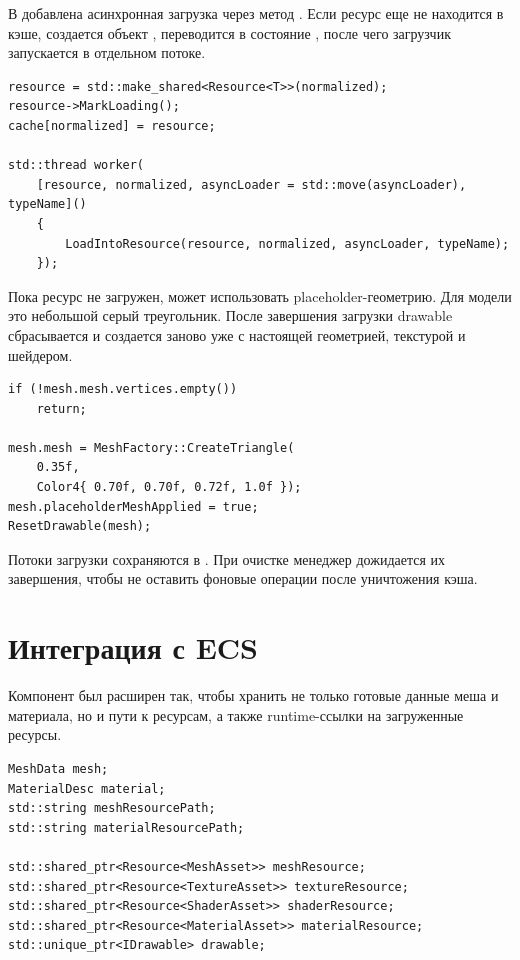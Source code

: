 \documentclass[14pt,a4paper]{extarticle}
\begin{document}
В  добавлена асинхронная загрузка через метод . Если ресурс еще
не находится в кэше, создается объект , переводится в состояние , после
чего загрузчик запускается в отдельном потоке.

\begin{lstlisting}[style=cppgost,caption={Идея асинхронной загрузки ресурса}]
resource = std::make_shared<Resource<T>>(normalized);
resource->MarkLoading();
cache[normalized] = resource;

std::thread worker(
    [resource, normalized, asyncLoader = std::move(asyncLoader), typeName]()
    {
        LoadIntoResource(resource, normalized, asyncLoader, typeName);
    });
\end{lstlisting}

Пока ресурс не загружен,  может использовать placeholder-геометрию. Для
модели это небольшой серый треугольник. После завершения загрузки drawable сбрасывается и создается заново
уже с настоящей геометрией, текстурой и шейдером.

\begin{lstlisting}[style=cppgost,caption={Placeholder-модель при асинхронной загрузке}]
if (!mesh.mesh.vertices.empty())
    return;

mesh.mesh = MeshFactory::CreateTriangle(
    0.35f,
    Color4{ 0.70f, 0.70f, 0.72f, 1.0f });
mesh.placeholderMeshApplied = true;
ResetDrawable(mesh);
\end{lstlisting}

Потоки загрузки сохраняются в . При очистке менеджер дожидается их завершения,
чтобы не оставить фоновые операции после уничтожения кэша.

\section{Интеграция с ECS}

Компонент  был расширен так, чтобы хранить не только готовые данные меша и
материала, но и пути к ресурсам, а также runtime-ссылки на загруженные ресурсы.

\begin{lstlisting}[style=cppgost,caption={Поля MeshRendererComponent для ресурсов}]
MeshData mesh;
MaterialDesc material;
std::string meshResourcePath;
std::string materialResourcePath;

std::shared_ptr<Resource<MeshAsset>> meshResource;
std::shared_ptr<Resource<TextureAsset>> textureResource;
std::shared_ptr<Resource<ShaderAsset>> shaderResource;
std::shared_ptr<Resource<MaterialAsset>> materialResource;
std::unique_ptr<IDrawable> drawable;
\end{lstlisting}
\end{document}
